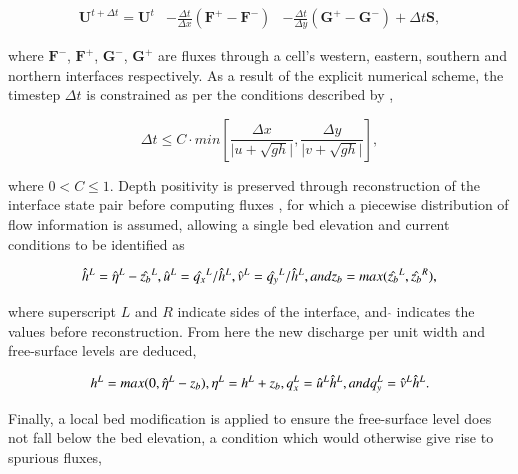 \documentclass[11pt,english,a4paper]{article}
\begin{document}
\begin{equation}
	\label{GodunovUpdate}
	\begin{alignedat}{2}
	\textbf{U}^{t+\Delta t} = \textbf{U}^t & - \frac{\Delta t}{\Delta x}(\textbf{F}^+ - \textbf{F}^-) 
					     &  - \frac{\Delta t}{\Delta y}(\textbf{G}^+ - \textbf{G}^-) + \Delta t \textbf{S} , 
	\end{alignedat}
\end{equation}

where \(\textbf{F}^-\), \(\textbf{F}^+\), \(\textbf{G}^-\), \(\textbf{G}^+\) are fluxes through a cell's western, eastern, southern and northern interfaces respectively. As a result of the explicit numerical scheme, the timestep \(\Delta{t}\) is constrained as per the conditions described by \citet{Courant1967},

\begin{equation}
	\label{CFL}
	\Delta t \le C \cdot min \left[\frac{\Delta x}{\lvert u + \sqrt{gh} \rvert} , \frac{\Delta y}{\lvert v + \sqrt{gh} \rvert}\right] ,
\end{equation}

where \(0 < C \le 1\). Depth positivity is preserved through reconstruction of the interface state pair before computing fluxes \citep{Liang2010b}, for which a piecewise distribution of flow information is assumed, allowing a single bed elevation and current conditions to be identified as

\begin{equation}
	\label{Reconstruction1}
		\hat{h}^L = \hat{\eta}^{L} - \hat{z_{b}}^{L}, \hfill
		\hat{u}^L = \hat{q_x}^{L} / \hat{h}^{L}, \hfill
		\hat{v}^L = \hat{q_y}^{L} / \hat{h}^{L}, \hfill and \hfill
		z_b = max( \hat{z_b}^{L} , \hat{z_{b}}^{R} ) , \hfill
\end{equation}

where superscript \(L\) and \(R\) indicate sides of the interface, and \(\hat{}\) indicates the values before reconstruction. From here the new discharge per unit width and free-surface levels are deduced,

\begin{equation}
	\label{Reconstruction2}
		h^L = max( 0, \hat{\eta}^{L} - z_{b} ), \hfill
		\eta^L = h^L + z_b, \hfill
		q_x^L = \hat{u}^L\hat{h}^L, \hfill and \hfill
		q_y^L = \hat{v}^L\hat{h}^L . \hfill
\end{equation}

Finally, a local bed modification is applied to ensure the free-surface level does not fall below the bed elevation, a condition which would otherwise give rise to spurious fluxes,
\end{document}
